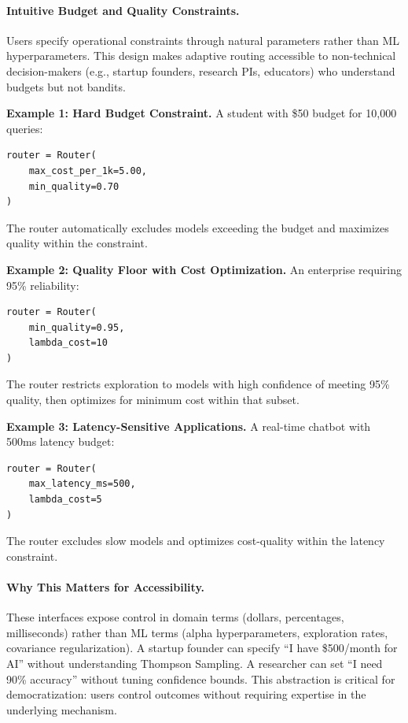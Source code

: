 \paragraph{Intuitive Budget and Quality Constraints.}
Users specify operational constraints through natural parameters rather than ML hyperparameters. This design makes adaptive routing accessible to non-technical decision-makers (e.g., startup founders, research PIs, educators) who understand budgets but not bandits.

\textbf{Example 1: Hard Budget Constraint.}
A student with \$50 budget for 10,000 queries:

\begin{small}
\begin{verbatim}
router = Router(
    max_cost_per_1k=5.00,
    min_quality=0.70
)
\end{verbatim}
\end{small}

The router automatically excludes models exceeding the budget and maximizes quality within the constraint.

\textbf{Example 2: Quality Floor with Cost Optimization.}
An enterprise requiring 95\% reliability:

\begin{small}
\begin{verbatim}
router = Router(
    min_quality=0.95,
    lambda_cost=10
)
\end{verbatim}
\end{small}

The router restricts exploration to models with high confidence of meeting 95\% quality, then optimizes for minimum cost within that subset.

\textbf{Example 3: Latency-Sensitive Applications.}
A real-time chatbot with 500ms latency budget:

\begin{small}
\begin{verbatim}
router = Router(
    max_latency_ms=500,
    lambda_cost=5
)
\end{verbatim}
\end{small}

The router excludes slow models and optimizes cost-quality within the latency constraint.

\paragraph{Why This Matters for Accessibility.}
These interfaces expose control in domain terms (dollars, percentages, milliseconds) rather than ML terms (alpha hyperparameters, exploration rates, covariance regularization). A startup founder can specify ``I have \$500/month for AI'' without understanding Thompson Sampling. A researcher can set ``I need 90\% accuracy'' without tuning confidence bounds. This abstraction is critical for democratization: users control outcomes without requiring expertise in the underlying mechanism.

